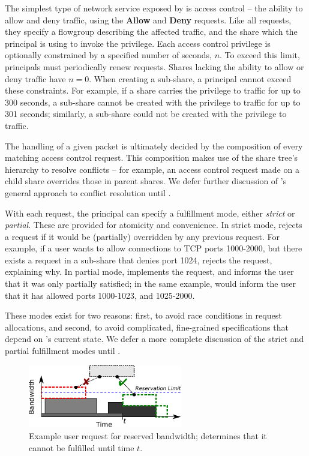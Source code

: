 The simplest type of network service exposed by \sys is access control
-- the ability to allow and deny traffic, using the \textbf{Allow} and
\textbf{Deny} requests.  Like all requests, they specify a flowgroup
describing the affected traffic, and the share which the principal is
using to invoke the privilege.
Each access control privilege is optionally constrained by a specified
number of seconds, $n$.
To exceed this limit, principals must periodically renew requests.
Shares lacking the ability to allow or deny traffic have $n = 0$.
When creating a sub-share, a principal cannot exceed these constraints. For example,
if a share carries the privilege to  traffic for up to
300 seconds, a sub-share cannot be created with the privilege to 
traffic for up to 301 seconds; similarly, a sub-share could not be created
with the privilege to  traffic.

The handling of a given packet is ultimately decided by the
composition of every matching access control request. This composition
makes use of the share tree's hierarchy to resolve conflicts -- for
example, an access control request made on a child share overrides
those in parent shares.  We defer further discussion of \sys's general
approach to conflict resolution until
.

With each request, the principal can specify a fulfillment mode, either
\emph{strict} or \emph{partial}. These are provided for atomicity and
convenience. In strict mode, \sys rejects a request if it would be
(partially) overridden by any previous request.
For example, if a user wants to allow connections to TCP ports
1000-2000, but there exists a request in a sub-share that denies port
1024, \sys rejects the request, explaining why.  In partial mode, \sys
implements the request, and informs the user that it was only
partially satisfied;
in the same example, \sys would inform the user that it has allowed
ports 1000-1023, and 1025-2000.

These modes exist for two reasons: first, to avoid race conditions in
request allocations, and second, to avoid complicated, fine-grained
specifications that depend on \sys's current state. We defer a more
complete discussion of the strict and partial fulfillment modes until
.

\begin{figure}[t]
\centering
\includegraphics[width=0.6\textwidth]{figs/sched}
\caption{Example user request for reserved bandwidth;
\sys determines that it cannot be fulfilled until time $t$.}
\label{fig:sched}
\end{figure}


